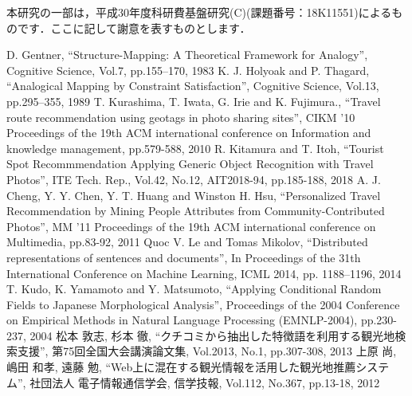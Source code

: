 \documentclass[submit]{ipsj}
\begin{document}
\begin{acknowledgment}
本研究の一部は，平成30年度科研費基盤研究(C)(課題番号：18K11551)によるものです．ここに記して謝意を表すものとします．
\end{acknowledgment}


\begin{thebibliography}{11}
    D. Gentner,
      ``Structure-Mapping: A Theoretical Framework for Analogy'',
      Cognitive Science, Vol.7, pp.155–170, 1983
    K. J. Holyoak and P. Thagard,
      ``Analogical Mapping by Constraint Satisfaction'',
      Cognitive Science, Vol.13, pp.295–355, 1989
    T. Kurashima, T. Iwata, G. Irie and K. Fujimura.,
      ``Travel route recommendation using geotags in photo sharing sites'',
      CIKM '10 Proceedings of the 19th ACM international conference on Information and knowledge management, pp.579-588, 2010
    R. Kitamura and T. Itoh,
      ``Tourist Spot Recommmendation Applying Generic Object Recognition with Travel Photos'',
      ITE Tech. Rep., Vol.42, No.12, AIT2018-94, pp.185-188, 2018
    A. J. Cheng, Y. Y. Chen, Y. T. Huang and Winston H. Hsu,
      ``Personalized Travel Recommendation by Mining People Attributes from Community-Contributed Photos'',
      MM '11 Proceedings of the 19th ACM international conference on Multimedia, pp.83-92, 2011
    Quoc V. Le and Tomas Mikolov,
      ``Distributed representations of sentences and documents'',
      In Proceedings of the 31th International Conference on Machine Learning, ICML 2014, pp. 1188–1196, 2014
    T. Kudo, K. Yamamoto and Y. Matsumoto,
      ``Applying Conditional Random Fields to Japanese Morphological Analysis'',
      Proceedings of the 2004 Conference on Empirical Methods in Natural Language Processing (EMNLP-2004), pp.230-237, 2004
    松本 敦志, 杉本 徹,
      ``クチコミから抽出した特徴語を利用する観光地検索支援'',
      第75回全国大会講演論文集, Vol.2013, No.1, pp.307-308, 2013
    上原 尚, 嶋田 和孝, 遠藤 勉,
      ``Web上に混在する観光情報を活用した観光地推薦システム'',
      社団法人 電子情報通信学会, 信学技報, Vol.112, No.367, pp.13-18, 2012
\end{thebibliography}

\begin{biography}
%
\end{biography}
\end{document}
